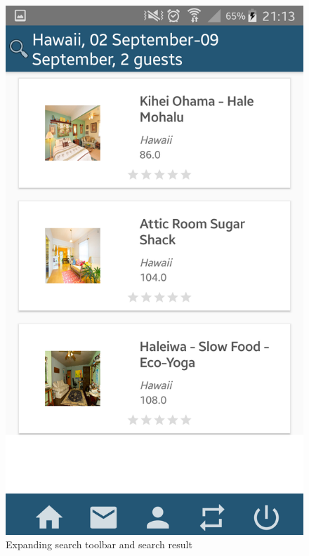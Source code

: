 \documentclass[12pt]{article}
\begin{document}
\begin{figure}
\begin{center}
			\includegraphics[scale=0.15, keepaspectratio]{07-searchResult.png}  
		\end{center}
		\caption{Expanding search toolbar and search result}
	\end{figure}
	
\end{document}
